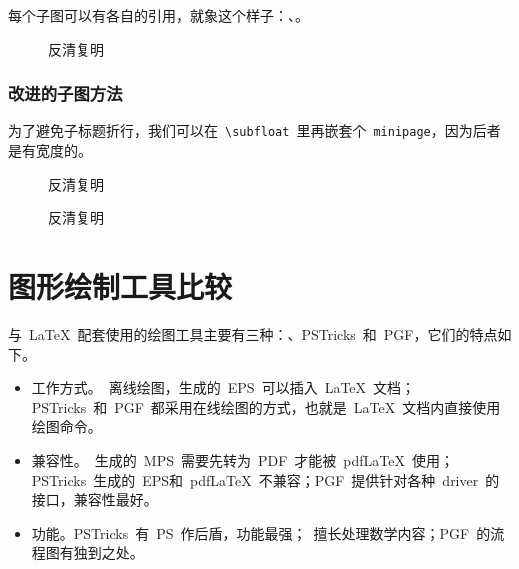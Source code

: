 每个子图可以有各自的引用，就象这个样子：、。
\begin{figure}[htbp]
\centering
{}
\hspace{80pt}
\caption{反清复明}
\end{figure}

\subsubsection{改进的子图方法}
为了避免子标题折行，我们可以在~\verb|\subfloat|~里再嵌套个~\verb|minipage|，因为后者是有宽度的。
\begin{code}
\begin{figure}[htbp]
\centering
{}
\caption{反清复明}
\end{figure}
\end{code}

\begin{figure}[htbp]
\centering
{}
\caption{反清复明}
\end{figure}

\section{图形绘制工具比较}
与~\LaTeX~配套使用的绘图工具主要有三种：\MP、PSTricks~和~PGF，它们的特点如下。

\begin{itemize}
\item 工作方式。\MP~离线绘图，生成的~EPS~可以插入~\LaTeX~文档；PSTricks~和~PGF~都采用在线绘图的方式，也就是~\LaTeX~文档内直接使用绘图命令。
\item 兼容性。\MP~生成的~MPS~需要先转为~PDF~才能被~pdf\LaTeX~使用；PSTricks~生成的~EPS和~pdf\LaTeX~不兼容；PGF~提供针对各种~driver~的接口，兼容性最好。
\item 功能。PSTricks~有~PS~作后盾，功能最强；\MP~擅长处理数学内容；PGF~的流程图有独到之处。
\end{itemize}

